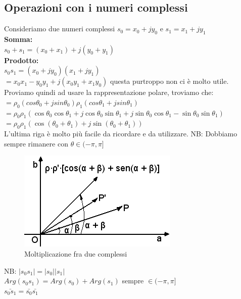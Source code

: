 \subsection*{Operazioni con i numeri complessi}
Consideriamo due numeri complessi $ s_{0} = x_{0}+jy_{0} $ e $ s_{1} = x_{1}+jy_{1} $ \\

\textbf{Somma:} \\
$ s_{0} + s_{1} = ( x_{0}+x_{1} ) + j (y_{0} + y_{1}) $ \\

\textbf{Prodotto:} \\
$ s_{0} s_{1} = ( x_{0} + j y_{0})( x_{1} + j y_{1}) $ \\
$ = x_{0} x_{1} - y_{0} y_{1} + j (x_{0} y_{1} + x_{1} y_{0} ) $ questa purtroppo non ci è molto utile.\\
Proviamo quindi ad usare la rappresentazione polare, troviamo che: \\
$ = \rho_{0} (cos\theta_{0} + j sin\theta_{0})\rho_{1} (cos\theta_{1} + j sin\theta_{1}) $ \\
$ = \rho_{0} \rho_{1} ( \cos\theta_{0} \cos\theta_{1} + j \cos\theta_{0} \sin\theta_{1} + j \sin\theta_{0} \cos\theta_{1}-\sin\theta_{0} \sin\theta_{1}) $ \\
$ = \rho_{0} \rho_{1} ( \cos (\theta_{0} + \theta_{1}) + j \sin ( \theta_{0} + \theta_{1} )) $ \\
L'ultima riga è molto più facile da ricordare e da utilizzare.
NB: Dobbiamo sempre rimanere con $\theta \in (-\pi , \pi]$

\begin{figure}[h]
	\centering
	\includegraphics[scale=0.5]{immagini/moltiplicazioneComplessi}
	\caption{ Moltiplicazione fra due complessi }
	\label{fig: Moltiplicazione fra due complessi}
\end{figure}

NB: $ |s_{0} s_{1}| = |s_{0}||s_{1}|$ \\
$ Arg( s_{0} s_{1} ) = Arg(s_{0} ) + Arg( s_{1} )$ sempre $ \in (-\pi , \pi]$\\
$ \bar{s_{0} s_{1}} = \bar{s_{0} } \bar{s_{1}}$ \\

